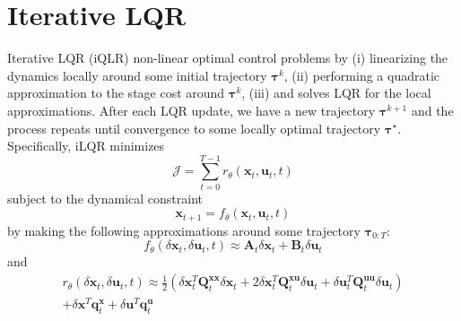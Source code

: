 \documentclass[a4paper,11pt]{article}
\renewcommand\b\bm
\begin{document}
\section{Iterative LQR}
Iterative LQR (iQLR) \citep{li2004iterative,Tassa2014} non-linear optimal control problems by (i) linearizing the dynamics locally around some initial trajectory $\b{\tau}^k$, (ii) performing a quadratic approximation to the stage cost around $\b{\tau}^k$, (iii) and solves LQR for the local approximations.
After each LQR update, we have a new trajectory $\b{\tau}^{k+1}$ and the process repeats until convergence to some locally optimal trajectory $\b{\tau}^\star$.
Specifically, iLQR minimizes 
%
\begin{equation}
    \mathcal{J} = \sum_{t=0}^{T-1} r_\theta(\b{x}_t,\b{u}_t,t)
\end{equation}
%
subject to the dynamical constraint
%
\begin{equation}
    \b{x}_{t+1} = f_\theta(\b{x}_t, \b{u}_t, t)
\end{equation}
%
by making the following approximations around some trajectory $\b{\tau}_{0:T}$:
%
\begin{equation}
    f_\theta(\delta\b{x}_t, \delta\b{u}_t, t) \approx \b{A}_t \delta\b{x}_t + \b{B}_t \delta\b{u}_t
\end{equation}
%
and
%
\begin{equation}
    \begin{split}
    r_\theta(\delta\b{x}_t, \delta\b{u}_t, t) \approx
    \frac{1}{2}
    (\delta\b{x}^T_t \b{Q}^{\b{xx}}_t \delta\b{x}_t
    + 2 \delta\b{x}^T_t \b{Q}^{\b{xu}}_t \delta\b{u}_t
    + \delta\b{u}^T_t \b{Q}^{\b{uu}}_t \delta\b{u}_t)\\
    + \delta\b{x}^T \b{q}^{\b{x}}_t 
    + \delta\b{u}^T \b{q}^{\b{u}}_t
    \end{split}
\end{equation}
%
\end{document}
